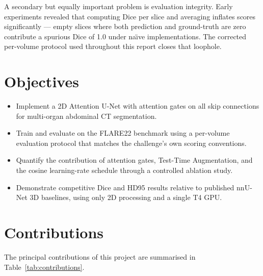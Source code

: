 A secondary but equally important problem is evaluation integrity. Early experiments revealed that
computing Dice per slice and averaging inflates scores significantly --- empty slices where both
prediction and ground-truth are zero contribute a spurious Dice of 1.0 under na\"\i{}ve
implementations. The corrected per-volume protocol used throughout this report closes that
loophole.

\section{Objectives}

\begin{itemize}
    \item Implement a 2D Attention U-Net with attention gates on all skip connections for
          multi-organ abdominal CT segmentation.
    \item Train and evaluate on the FLARE22 benchmark using a per-volume evaluation protocol that
          matches the challenge's own scoring conventions.
    \item Quantify the contribution of attention gates, Test-Time Augmentation, and the cosine
          learning-rate schedule through a controlled ablation study.
    \item Demonstrate competitive Dice and HD95 results relative to published nnU-Net 3D baselines,
          using only 2D processing and a single T4 GPU.
\end{itemize}

\section{Contributions}

The principal contributions of this project are summarised in Table~\ref{tab:contributions}.

